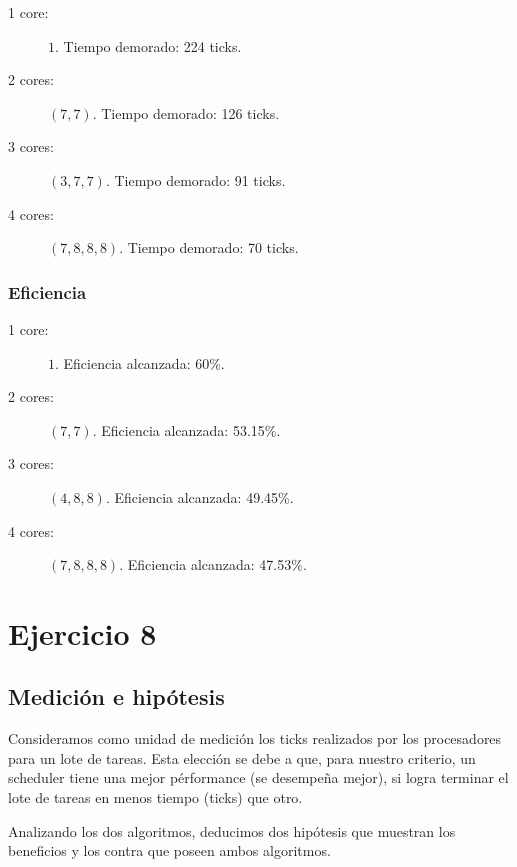 \documentclass[a4paper,10pt,twoside]{article}
\begin{document}
\begin{description}
	\item[1 core:] $1$.             Tiempo demorado: 224 ticks.
	\item[2 cores:] $(7, 7)$.       Tiempo demorado: 126 ticks.
	\item[3 cores:] $(3, 7, 7)$.    Tiempo demorado: 91 ticks.
	\item[4 cores:] $(7, 8, 8, 8)$. Tiempo demorado: 70 ticks.
\end{description}


\subsubsection{Eficiencia}

\begin{description}
	\item[1 core:] $1$.             Eficiencia alcanzada: 60\%.
	\item[2 cores:] $(7, 7)$.       Eficiencia alcanzada: 53.15\%.
	\item[3 cores:] $(4, 8, 8)$.    Eficiencia alcanzada: 49.45\%.
	\item[4 cores:] $(7, 8, 8, 8)$. Eficiencia alcanzada: 47.53\%.
\end{description}




\section{Ejercicio 8}

\subsection{Medición e hipótesis}
Consideramos como unidad de medición los ticks realizados por los procesadores para un lote de tareas. Esta elección se debe a que, para nuestro criterio, un scheduler tiene una mejor pérformance (se desempeña mejor), si logra terminar el lote de tareas en menos tiempo (ticks) que otro.

Analizando los dos algoritmos, deducimos dos hipótesis que muestran los beneficios y los contra que poseen ambos algoritmos.
\end{document}

